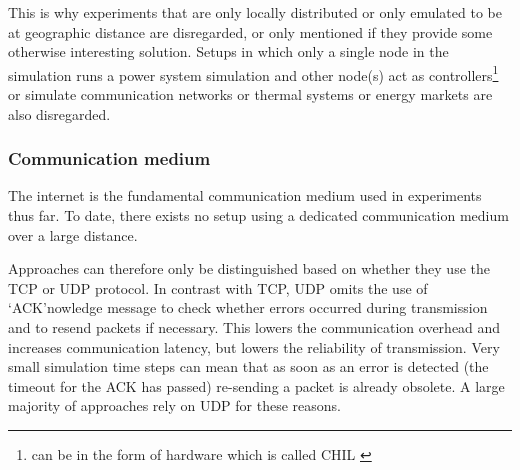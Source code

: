 \documentclass[a4paper,ngerman]{atseminar}
\begin{document}
This is why experiments that are only locally distributed \cite{yang2013, lin-yu2012, jiang2016, ravikumar2009} or only emulated to be at geographic distance \cite{li2017, liu2016} are disregarded, or only mentioned if they provide some otherwise interesting solution. Setups in which only a single node in the simulation runs a power system simulation and other node(s) act as controllers\footnote{can be in the form of hardware which is called CHIL \cite{syed2020standard}} \cite{wang2020, montoya2018, pau2018, barbierato2019} or simulate communication networks \cite{nguyen2020} or thermal systems \cite{faruque2009a, faruque2009b} or energy markets \cite{vogt2019} are also disregarded.




\subsubsection{Communication medium}
\label{MH:sec:comm}

The internet is the fundamental communication medium used in experiments thus far. To date, there exists no setup using a dedicated communication medium over a large distance.

Approaches can therefore only be distinguished based on whether they use the TCP or UDP protocol.
In contrast with TCP, UDP omits the use of `ACK'nowledge message to check whether errors occurred during transmission and to resend packets if necessary. This lowers the communication overhead and increases communication latency, but lowers the reliability of transmission. Very small simulation time steps can mean that as soon as an error is detected (the timeout for the ACK has passed) re-sending a packet is already obsolete. A large majority of approaches rely on UDP for these reasons.
\end{document}
